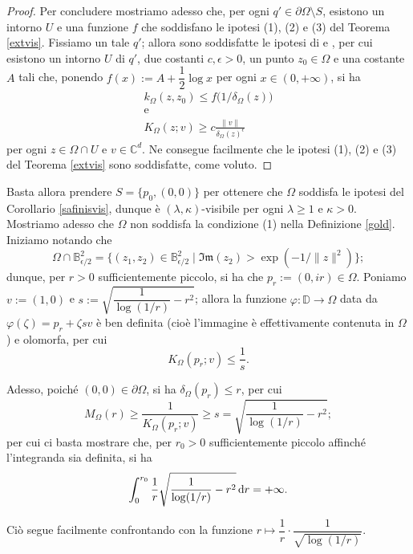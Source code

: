 \begin{proof}
    Per concludere mostriamo adesso che, per ogni $q'\in\partial\Omega\setminus S$, esistono un intorno $U$ e una funzione $f$ che soddisfano le ipotesi (1), (2) e (3) del Teorema \ref{extvis}. Fissiamo un tale $q'$; allora sono soddisfatte le ipotesi di \cite[Theorem 1]{Ch} e \cite[Proposition 2.5]{FR}, per cui esistono un intorno $U$ di $q'$, due costanti $c,\epsilon>0$, un punto $z_0\in\Omega$ e una costante $A$ tali che, ponendo $f(x):=A+\dfrac{1}{2}\log{x}$ per ogni $x\in(0,+\infty)$, si ha
    \begin{gather*}
        k_\Omega(z,z_0) \le f\big(1/\delta_\Omega(z)\big)\\
        \text{e}\\
        K_\Omega(z;v) \ge c\frac{\|v\|}{\delta_\Omega(z)^{\epsilon}}
    \end{gather*}
    per ogni $z\in\Omega\cap U$ e $v\in\mathbb{C}^d$. Ne consegue facilmente che le ipotesi (1), (2) e (3) del Teorema \ref{extvis} sono soddisfatte, come voluto.
\end{proof}

Basta allora prendere $S=\{p_0,(0,0)\}$ per ottenere che $\Omega$ soddisfa le ipotesi del Corollario \ref{safinisvis}, dunque è $(\lambda,\kappa)$-visibile per ogni $\lambda\ge 1$ e $\kappa>0$. \\

Mostriamo adesso che $\Omega$ non soddisfa la condizione (1) nella Definizione \ref{gold}. Iniziamo notando che
$$\Omega\cap\mathbb{B}^2_{\epsilon/2}=\{(z_1,z_2)\in\mathbb{B}^2_{\epsilon/2}\mid \mathfrak{Im}(z_2)>\exp(-1/\|z\|^2)\};$$
dunque, per $r>0$ sufficientemente piccolo, si ha che $p_r:=(0,ir)\in\Omega$. Poniamo $v:=(1,0)$ e $s:=\sqrt{\dfrac{1}{\log(1/r)}-r^2}$; allora la funzione $\varphi:\mathbb{D}\longrightarrow\Omega$ data da $\varphi(\zeta)=p_r+\zeta sv$ è ben definita (cioè l'immagine è effettivamente contenuta in $\Omega$) e olomorfa, per cui
$$K_\Omega(p_r;v) \le \frac{1}{s}.$$

Adesso, poiché $(0,0)\in\partial\Omega$, si ha $\delta_\Omega(p_r) \le r$, per cui
$$M_\Omega(r) \ge \frac{1}{K_\Omega(p_r;v)} \ge s=\sqrt{\frac{1}{\log(1/r)}-r^2};$$
per cui ci basta mostrare che, per $r_0>0$ sufficientemente piccolo affinché l'integranda sia definita, si ha
$$\int_0^{r_0}\frac{1}{r}\sqrt{\frac{1}{\log(1/r)}-r^2}\mathop{}\!\mathrm{d} r=+\infty.$$

Ciò segue facilmente confrontando con la funzione $r \longmapsto \dfrac{1}{r}\cdot\dfrac{1}{\sqrt{\log(1/r)}}$.